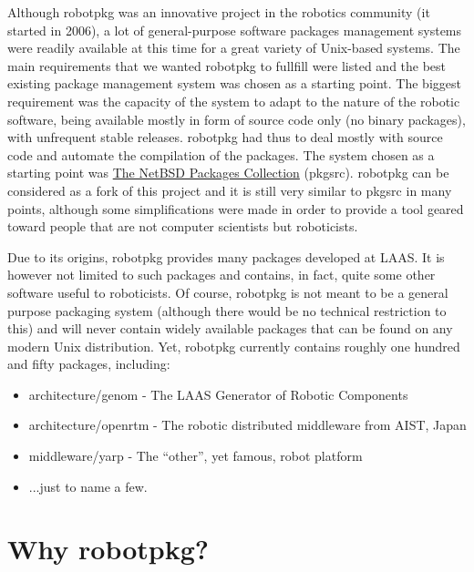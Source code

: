 Although  robotpkg was an  innovative   project in  the robotics community  (it
started in 2006), a lot of general-purpose software packages management systems
were readily available at this time for  a great variety of Unix-based systems.
The main requirements that we wanted  robotpkg to fullfill  were listed and the
best existing package management system  was chosen as  a starting point.   The
biggest requirement was the  capacity of the system to  adapt to the  nature of
the robotic software,  being available mostly in form  of source code  only (no
binary packages),  with unfrequent stable  releases.  robotpkg had thus to deal
mostly with  source code  and automate the  compilation of  the  packages.  The
system chosen  as a starting  point was \href{http://www.pkgsrc.org}{The NetBSD
Packages  Collection} (pkgsrc).  robotpkg  can be considered as  a fork of this
project and  it is still very similar  to pkgsrc in  many points, although some
simplifications were made in order to provide  a tool geared toward people that
are not computer scientists but roboticists.

Due to its  origins, robotpkg provides many packages  developed at LAAS.  It is
however not  limited to such  packages and contains, in  fact, quite some other
software useful to  roboticists.  Of  course, robotpkg  is  not meant to  be  a
general purpose  packaging system   (although  there  would  be   no  technical
restriction to this) and will never  contain widely available packages that can
be found  on  any modern  Unix  distribution. Yet, robotpkg currently  contains
roughly one hundred and fifty packages, including:

\begin{itemize}
   \item architecture/genom - The LAAS Generator of Robotic Components

   \item architecture/openrtm - The robotic distributed middleware from AIST, Japan

   \item middleware/yarp - The ``other'', yet famous, robot platform

   \item ...just to name a few.
\end{itemize}


\section{Why robotpkg?} %

